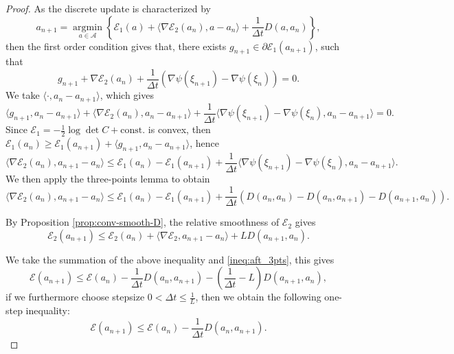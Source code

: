 \documentclass[11pt]{article}
\theoremstyle{plain}
\theoremstyle{definition}
\theoremstyle{remark}
\begin{document}
\begin{proof}
    As the discrete update is characterized by
    \begin{equation*}
        a_{n+1} = \operatorname*{argmin}_{a\in \mathcal{A}} \left\{\mathcal{E}_1 (a) + \langle \nabla \mathcal{E}_2 (a_n), a - a_n\rangle + \frac{1}{\Delta t} D (a, a_n)\right\},
    \end{equation*}
    then the first order condition gives that, there exists $g_{n+1} \in \partial \mathcal{E}_1 (a_{n+1})$, such that
    \begin{equation*}
        g_{n+1} + \nabla \mathcal{E}_2 (a_n) + \frac{1}{\Delta t} (\nabla \psi(\xi_{n+1}) - \nabla \psi (\xi_n)) = 0.
    \end{equation*}
    We take $\langle \cdot, a_n - a_{n+1} \rangle$, which gives
    \begin{equation*}
        \langle g_{n+1}, a_n - a_{n+1} \rangle + \langle \nabla \mathcal{E}_2 (a_n), a_n - a_{n+1} \rangle + \frac{1}{\Delta t} \langle \nabla \psi(\xi_{n+1}) - \nabla \psi (\xi_n), a_n - a_{n+1} \rangle = 0.
    \end{equation*}
    Since $\mathcal{E}_1 = -\frac{1}{2} \log \det C + \text{const.}$ is convex, then $\mathcal{E}_1 (a_n) \geq \mathcal{E}_1 (a_{n+1}) + \langle g_{n+1}, a_n - a_{n+1} \rangle$, hence 
    \begin{equation*}
        \langle \nabla \mathcal{E}_2 (a_n), a_{n+1} - a_n \rangle \leq \mathcal{E}_1(a_n) - \mathcal{E}_1 (a_{n+1}) + \frac{1}{\Delta t} \langle \nabla \psi(\xi_{n+1}) - \nabla \psi (\xi_n), a_n - a_{n+1} \rangle.
    \end{equation*}
    We then apply the three-points lemma \citep[Lemma 9.11]{beck2017first} to obtain 
    \begin{equation}\label{ineq:aft_3pts}
        \langle \nabla \mathcal{E}_2 (a_n), a_{n+1} - a_n \rangle \leq \mathcal{E}_1(a_n) - \mathcal{E}_1 (a_{n+1}) + \frac{1}{\Delta t} (D (a_n, a_n) - D (a_n, a_{n+1}) - D (a_{n+1}, a_n)).
    \end{equation}

    By Proposition \ref{prop:conv-smooth-D}, the relative smoothness of $\mathcal{E}_2$ gives
    \begin{equation*}
        \mathcal{E}_2 (a_{n+1}) \leq \mathcal{E}_2 (a_n) + \langle \nabla \mathcal{E}_2, a_{n+1} - a_n \rangle + L D (a_{n+1}, a_n).
    \end{equation*}

    We take the summation of the above inequality and \eqref{ineq:aft_3pts}, this gives
    \begin{equation*}
        \mathcal{E} (a_{n+1}) \leq \mathcal{E} (a_n) - \frac{1}{\Delta t} D (a_n, a_{n+1}) - \left(\frac{1}{\Delta t} - L\right) D (a_{n+1}, a_n),
    \end{equation*}
    if we furthermore choose stepsize $0 < \Delta t \leq \frac{1}{L}$, then we obtain the following one-step inequality:
    \begin{equation*}
        \mathcal{E} (a_{n+1}) \leq \mathcal{E} (a_n) - \frac{1}{\Delta t} D (a_n, a_{n+1}).
    \end{equation*}
\end{proof}
\end{document}
